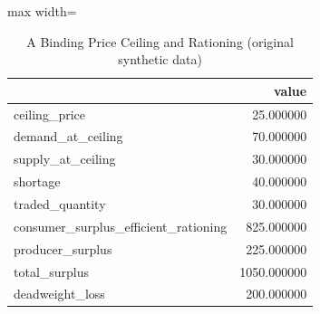 \begin{table}[htbp]
\centering
\caption{A Binding Price Ceiling and Rationing (original synthetic data)}
\begingroup
\small
\setlength{\tabcolsep}{6pt}
\renewcommand{\arraystretch}{1.12}
\begin{adjustbox}{max width=\linewidth}
\begin{tabular}{@{}lr@{}}
\toprule
 & value \\
\midrule
ceiling\_price & 25.000000 \\
demand\_at\_ceiling & 70.000000 \\
supply\_at\_ceiling & 30.000000 \\
shortage & 40.000000 \\
traded\_quantity & 30.000000 \\
consumer\_surplus\_efficient\_rationing & 825.000000 \\
producer\_surplus & 225.000000 \\
total\_surplus & 1050.000000 \\
deadweight\_loss & 200.000000 \\
\bottomrule
\end{tabular}
\end{adjustbox}
\endgroup
\end{table}